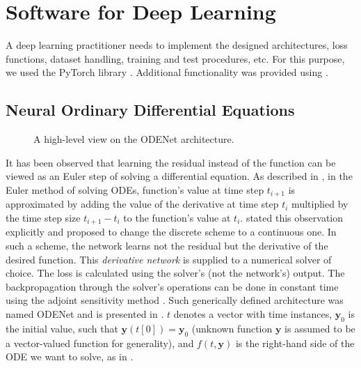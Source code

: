 \section*{Software for Deep Learning}

A deep learning practitioner needs to implement the designed architectures, loss functions, dataset handling, training and test procedures, etc. For this purpose, we used the PyTorch library \cite{Pytorch}. Additional functionality was provided using \cite{CoreAudioML}.

\subsection{Neural Ordinary Differential Equations}
\label{sec:neural_odes}

\begin{figure}
    \centering
    
    \caption{A high-level view on the ODENet architecture.}
    \label{fig:odenet_architecture}
\end{figure}

It has been observed that learning the residual instead of the function can be viewed as an Euler step of solving a differential equation. As described in , in the Euler method of solving \acp{ODE}, function's value at time step $t_{i+1}$ is approximated by adding the value of the derivative at time step $t_{i}$ multiplied by the time step size $t_{i+1} - t_i$ to the function's value at $t_i$. \cite{Chen2018} stated this observation explicitly
and proposed to change the discrete scheme to a continuous one. In such a scheme, the network learns not the residual but the derivative of the desired function. This \emph{derivative network} is supplied to a numerical solver of choice. The loss is calculated using the solver's (not the network's) output. The backpropagation through the solver's operations can be done in constant time using the adjoint sensitivity method \cite{Chen2018}. Such generically defined architecture was named ODENet and is presented in . $t$ denotes a vector with time instances, $\pmb{y}_0$ is the initial value, such that $\pmb{y}(t[0]) = \pmb{y}_0$ (unknown function $\pmb{y}$ is assumed to be a vector-valued function for generality), and $f(t, \pmb{y})$ is the right-hand side of the \ac{ODE} we want to solve, as in .

